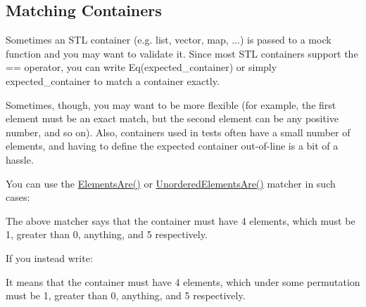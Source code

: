 \subsection*{Matching Containers}

Sometimes an S\+TL container (e.\+g. list, vector, map, ...) is passed to a mock function and you may want to validate it. Since most S\+TL containers support the {\ttfamily ==} operator, you can write {\ttfamily Eq(expected\+\_\+container)} or simply {\ttfamily expected\+\_\+container} to match a container exactly.

Sometimes, though, you may want to be more flexible (for example, the first element must be an exact match, but the second element can be any positive number, and so on). Also, containers used in tests often have a small number of elements, and having to define the expected container out-\/of-\/line is a bit of a hassle.

You can use the {\ttfamily \mbox{\hyperlink{namespacetesting_a79cf4ae694bf8231dcf283b325405f27}{Elements\+Are()}}} or {\ttfamily \mbox{\hyperlink{namespacetesting_a8622c12aadfa0e60f7d68683eeb21115}{Unordered\+Elements\+Are()}}} matcher in such cases\+:


\begin{DoxyCode}{0}
\DoxyCodeLine{}
\DoxyCodeLine{}
\end{DoxyCode}


The above matcher says that the container must have 4 elements, which must be 1, greater than 0, anything, and 5 respectively.

If you instead write\+:


\begin{DoxyCode}{0}
\DoxyCodeLine{}
\DoxyCodeLine{}
\end{DoxyCode}


It means that the container must have 4 elements, which under some permutation must be 1, greater than 0, anything, and 5 respectively.

